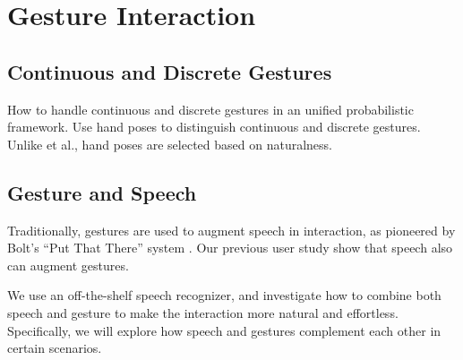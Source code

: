 \chapter{Gesture Interaction}
\section{Continuous and Discrete Gestures}
How to handle continuous and discrete gestures in an unified probabilistic
framework. Use hand poses to distinguish continuous and discrete gestures.
Unlike \cite{Oka02} et al., hand poses are selected based on naturalness.

\section{Gesture and Speech}
Traditionally, gestures are used to augment speech in interaction, as pioneered
by Bolt's ``Put That There'' system \cite{Bolt80}. Our previous user study
\cite{yin10thesis} show that speech also can augment gestures.

We use an off-the-shelf speech 
recognizer, and investigate how to combine both speech and gesture to make
the interaction more natural and effortless. Specifically, we will explore how speech and gestures complement each other in certain scenarios.
